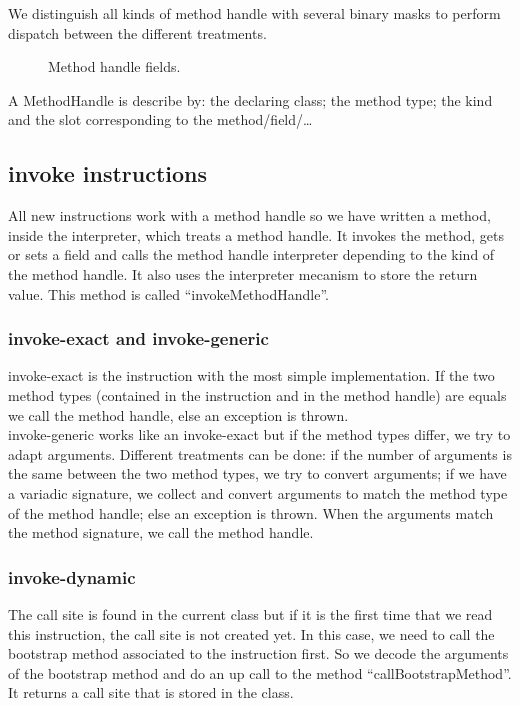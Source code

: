 \documentclass{sig-alternate}
\begin{document}
      We distinguish all kinds of method handle with several binary masks to perform dispatch between the different treatments.

      \begin{figure}[!h]
        \centering \vspace{-1.5em}
        \caption{Method handle fields.}
        \label{mhFields}
      \end{figure}

      A MethodHandle is describe by: the declaring class; the method type; the kind and the slot corresponding to the method/field/\dots

    \subsection{invoke instructions}
      All new instructions work with a method handle so we have written a method, inside the interpreter, which treats a method handle.
      It invokes the method, gets or sets a field and calls the method handle interpreter depending to the kind of the method handle.
      It also uses the interpreter mecanism to store the return value.
      This method is called ``invokeMethodHandle''.

    \subsubsection{invoke-exact and invoke-generic}
      invoke-exact is the instruction with the most simple implementation.
      If the two method types (contained in the instruction and in the method handle) are equals we call the method handle,
      else an exception is thrown.\\
      
      invoke-generic works like an invoke-exact but if the method types differ, we try to adapt arguments.
      Different treatments can be done:
      if the number of arguments is the same between the two method types, we try to convert arguments;
      if we have a variadic signature, we collect and convert arguments to match the method type of the method handle;
      else an exception is thrown.
      When the arguments match the method signature, we call the method handle.
  
    \subsubsection{invoke-dynamic}
      The call site is found in the current class but if it is the first time that we read this instruction, the call site is not created yet.
      In this case, we need to call the bootstrap method associated to the instruction first.
      So we decode the arguments of the bootstrap method and do an up call to the method ``callBootstrapMethod''.%
      It returns a call site that is stored in the class.
\end{document}
